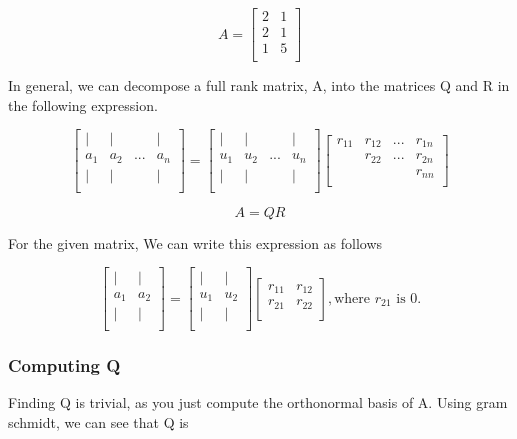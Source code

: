 \documentclass{article}
\begin{document}
$$
A=\left
[\begin{array}{cc}
2 & 1 \\
2 & 1 \\
1 & 5 \\
\end{array}\right]
$$

In general, we can decompose a full rank matrix, A, into the matrices Q and R in the following expression.

$$
\left
[\begin{array}{cccc}
| & | & & | \\
a_{1} & a_{2} & ... & a_{n} \\
| & | & & | \\
\end{array}\right]=\left
[\begin{array}{cccc}
| & | & &| \\
u_{1} & u_{2} & ... & u_{n} \\
| & | & &| \\
\end{array}\right]\left
[\begin{array}{cccc}
r_{1 1} & r_{1 2} & ... & r_{1 n} \\
 & r_{2 2} & ... & r_{2 n} \\
 &  & & r_{n n} \\
\end{array}\right]
$$

$$
A=QR
$$

For the given matrix, We can write this expression as follows

$$
\left
[\begin{array}{cc}
| & | \\
a_{1} & a_{2} \\
| & | \\
\end{array}\right]=\left
[\begin{array}{cc}
| & | \\
u_{1} & u_{2} \\
| & | \\
\end{array}\right]\left [\begin{array}{cc}
r_{11} & r_{1 2}  \\
r_{2 1} &     r_{2 2} \\
\end{array}\right], \text{where $r_{2 1}$ is 0.}
$$

\subsubsection{Computing Q}
Finding Q is trivial, as you just compute the orthonormal basis of A. Using gram schmidt, we can see that Q is
\end{document}
